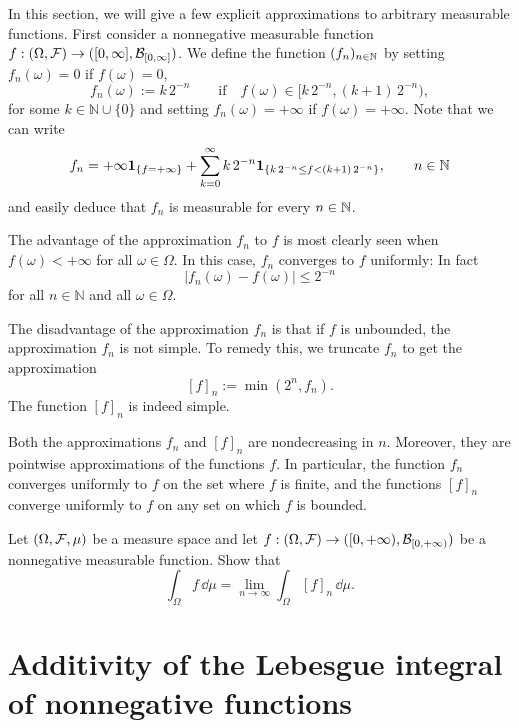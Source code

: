 In this section, we will give a few explicit approximations to arbitrary measurable functions. 
First consider a nonnegative measurable function $f : (\Omega, \mathcal F) \to ([0,\infty], \mathcal B_{[0,\infty]})$. We define the function $(f_n)_{n\in\mathbb N}$ by setting $f_n(\omega) = 0$ if $f(\omega) = 0$,
\[
	f_n(\omega) := k\, 2^{-n}\qquad \text{if}\quad f(\omega)\in [k\,2^{-n},(k+1)\,2^{-n}),
\]
for some $k \in \mathbb{N}\cup\{0\}$ and setting $f_n(\omega) = +\infty$ if $f(\omega) = +\infty$. Note that we can write
\[
	f_n = +\infty \mathbf{1}_{\{f=+\infty\}} + \sum_{k=0}^\infty k\, 2^{-n} \mathbf{1}_{\{k\,2^{-n}\le f < (k+1)\,2^{-n}\}} ,\qquad n\in\mathbb N
\]
and easily deduce that $f_n$ is measurable for every $n\in\mathbb N$.

The advantage of the approximation $f_n$ to $f$ is most clearly seen when $f(\omega) < +\infty$ for all $\omega \in \Omega$. In this case, $f_n$ converges to $f$ uniformly: In fact
\[
|f_n(\omega) - f(\omega)| \leq 2^{-n}
\]
for all $n \in \mathbb{N}$ and all $\omega \in \Omega$.

The disadvantage of the approximation $f_n$ is that if $f$ is unbounded, the approximation $f_n$ is not simple. To remedy this, we truncate $f_n$ to get the approximation
\[
	[f]_n := \min( 2^n, f_n ).
\]
The function $[f]_n$ is indeed simple.

Both the approximations $f_n$ and $[f]_n$ are nondecreasing in $n$. Moreover, they are pointwise approximations of the functions $f$. In particular, the function $f_n$ converges uniformly to $f$ on the set where $f$ is finite, and the functions $[f]_n$ converge uniformly to $f$ on any set on which $f$ is bounded.

\begin{problem}
	\label{prb:simple-approx-integral}
 Let $(\Omega, \mathcal F, \mu)$ be a measure space and let $f: (\Omega,\mathcal F) \to ([0,+\infty), \mathcal B_{[0,+\infty)})$ be a nonnegative measurable function. Show that
\[
\int_\Omega f\, \dd \mu = \lim_{n \to \infty} \int_\Omega [f]_n\, \dd \mu.
\]	
\end{problem}


\section{Additivity of the Lebesgue integral of nonnegative functions}

